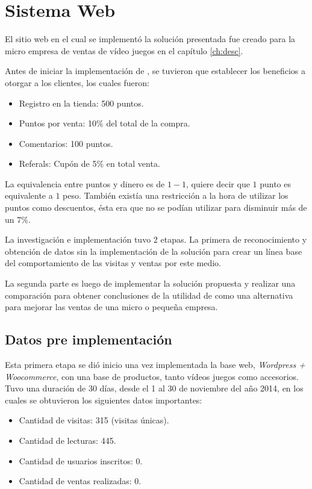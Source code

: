 \section{Sistema Web}

El sitio web en el cual se implementó la solución presentada fue creado para la micro empresa de
ventas de vídeo juegos en el capítulo \ref{ch:desc}.

Antes de iniciar la implementación de {\GAM}, se tuvieron que establecer los beneficios a otorgar a los 
clientes, los cuales fueron:

\begin{itemize}

\item Registro en la tienda: 500 puntos.
\item Puntos por venta: 10\% del total de la compra.
\item Comentarios: 100 puntos.
\item Referals: Cupón de 5\% en total venta.

\end{itemize}

La equivalencia entre puntos y dinero es de $1-1$, quiere decir que $1$ punto es equivalente a 
$1$ peso. También existía una restricción a la hora de utilizar los puntos como descuentos, ésta 
era que no se podían utilizar para disminuir más de un 7\%.

La investigación e implementación tuvo 2 etapas. La primera de reconocimiento y obtención de datos
 sin la implementación de la solución para crear un línea base del comportamiento de las visitas 
y ventas por este medio.

La segunda parte es luego de implementar la solución
propuesta y realizar una comparación para obtener conclusiones de la utilidad de
{\gam} como una alternativa para mejorar las ventas de una micro o pequeña empresa.

\subsection{Datos pre implementación {\gam}}

Esta primera etapa se dió inicio una vez implementada la base web,
\emph{Wordpress + Woocommerce}, con una base de productos, tanto vídeos juegos como
accesorios.
Tuvo una duración de 30 días, desde el 1 al 30 de noviembre del año 2014,
en los cuales se obtuvieron los siguientes datos importantes:


\begin{itemize}
    \item Cantidad de visitas: 315 (visitas únicas).
    \item Cantidad de lecturas: 445.
    \item Cantidad de usuarios inscritos: 0.
    \item Cantidad de ventas realizadas: 0.
\end{itemize}

